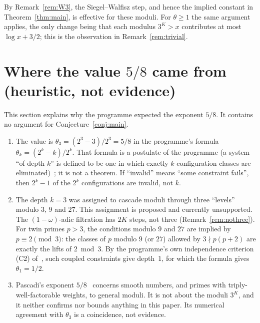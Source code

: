 \documentclass[12pt]{amsart}
\theoremstyle{plain}
\theoremstyle{definition}
\begin{document}
By Remark~\ref{rem:W3}, the Siegel--Walfisz step, and hence the implied
constant in Theorem~\ref{thm:main}, is effective for these moduli. For
$\theta \geq 1$ the same argument applies, the only change being that each
modulus $3^K > x$ contributes at most $\log x + 3/2$; this is the observation
in Remark~\ref{rem:trivial}.

\section{Where the value $5/8$ came from (heuristic, not evidence)}
\label{sec:heuristic}

This section explains why the programme expected the exponent $5/8$. It
contains no argument for Conjecture~\ref{conj:main}.

\begin{enumerate}[label=(\arabic*)]
  \item The value is $\theta_3 = (2^3 - 3)/2^3 = 5/8$ in the programme's
    formula $\theta_k = (2^k - k)/2^k$. That formula is a postulate of the
    programme (a system ``of depth $k$'' is defined to be one in which
    exactly $k$ configuration classes are
    eliminated)~\cite{WakilCF,WakilRamanujan}; it is not a theorem. If
    ``invalid'' means ``some constraint fails'', then $2^k - 1$ of the $2^k$
    configurations are invalid, not $k$.
  \item The depth $k = 3$ was assigned to cascade moduli through three
    ``levels'' modulo $3$, $9$ and $27$. This assignment is proposed and
    currently unsupported. The $(1-\omega)$-adic filtration has $2K$ steps,
    not three (Remark~\ref{rem:nothree}). For twin primes $p > 3$, the
    conditions modulo $9$ and $27$ are implied by $p \equiv 2 \pmod 3$: the
    classes of $p$ modulo $9$ (or $27$) allowed by $3 \nmid p(p+2)$ are
    exactly the lifts of $2 \bmod 3$. By the programme's own independence
    criterion (C2) of~\cite{WakilCF}, such coupled constraints give depth~$1$,
    for which the formula gives $\theta_1 = 1/2$.
  \item Pascadi's exponent $5/8$~\cite{Pascadi2025} concerns smooth numbers,
    and primes with triply-well-factorable weights, to general moduli. It is
    not about the moduli $3^K$, and it neither confirms nor bounds anything in
    this paper. Its numerical agreement with $\theta_3$ is a coincidence, not
    evidence.
\end{enumerate}
\end{document}
